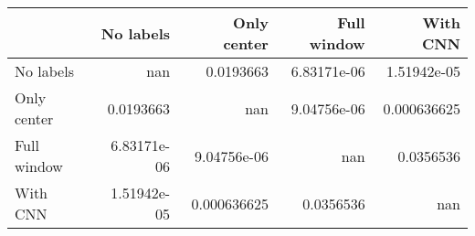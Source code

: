 \begin{tabular}{lrrrr}
\toprule
             &     No labels &   Only center &   Full window &      With CNN \\
\midrule
 No labels   & nan           &   0.0193663   &   6.83171e-06 &   1.51942e-05 \\
 Only center &   0.0193663   & nan           &   9.04756e-06 &   0.000636625 \\
 Full window &   6.83171e-06 &   9.04756e-06 & nan           &   0.0356536   \\
 With CNN    &   1.51942e-05 &   0.000636625 &   0.0356536   & nan           \\
\bottomrule
\end{tabular}